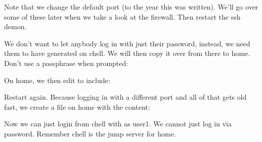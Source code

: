 \documentclass[a4paper,10pt,english]{sphinxmanual}
\begin{document}
Note that we change the default port (to the year this was written). We’ll go
over some of these later when we take a look at the firewall. Then restart the
ssh demon.

\begin{sphinxVerbatim}[commandchars=\\\{\}]
   
\end{sphinxVerbatim}

We don’t want to let anybody log in with just their password, instead, we need
them to have  generated on chell. We will then copy it over from
there to home. Don’t use a passphrase when prompted:

\begin{sphinxVerbatim}[commandchars=\\\{\}]
 
     
\end{sphinxVerbatim}

On home, we then edit  to include:

\begin{sphinxVerbatim}[commandchars=\\\{\}]
 
 
\end{sphinxVerbatim}

Restart again. Because logging in with a different port and all of that gets old
fast, we create a file  on home with the content:

\begin{sphinxVerbatim}[commandchars=\\\{\}]
 
     
     
     
\end{sphinxVerbatim}

Now we can just login from chell with  as user1. We cannot just log
in via password. Remember chell is the jump server for home.
\end{document}
